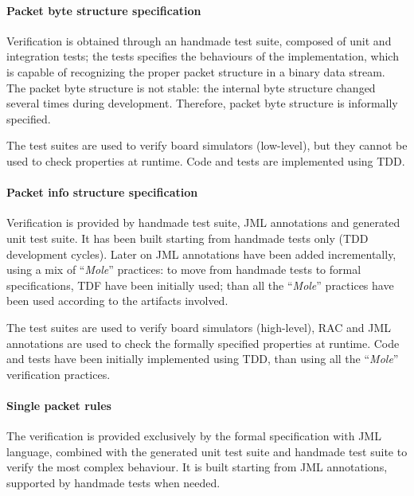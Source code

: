 \documentclass[english]{lni}
\newcommand{\mole}{``\emph{Mole}''\xspace}
\begin{document}
\paragraph*{Packet byte structure specification}

Verification is obtained through an handmade test suite, composed of unit and integration tests; the tests specifies the behaviours of the implementation, which is capable of recognizing the proper packet structure in a binary data stream. 
The packet byte structure is not stable: the internal byte structure changed several times during development.
Therefore, packet byte structure is informally specified.

The test suites are used to verify board simulators (low-level), but they cannot be used to check properties at runtime.
Code and tests are implemented using TDD.

\paragraph*{Packet info structure specification}

Verification is provided by handmade test suite, JML annotations and generated unit test suite. 
It has been built starting from handmade tests only (TDD development cycles).
Later on JML annotations have been added incrementally, using a mix of \mole practices: to move from handmade tests to formal specifications, TDF have been initially used; than all the \mole practices have been used according to the artifacts involved.

The test suites are used to verify board simulators (high-level), RAC and JML annotations are used to check the formally specified properties at runtime.
Code and tests have been initially implemented using TDD, than using all the \mole verification practices.

\paragraph*{Single packet rules}

The verification is provided exclusively by the formal specification with JML language, combined with the generated unit test suite and handmade test suite to verify the most complex behaviour.
It is built starting from JML annotations, supported by handmade tests when needed.
\end{document}
